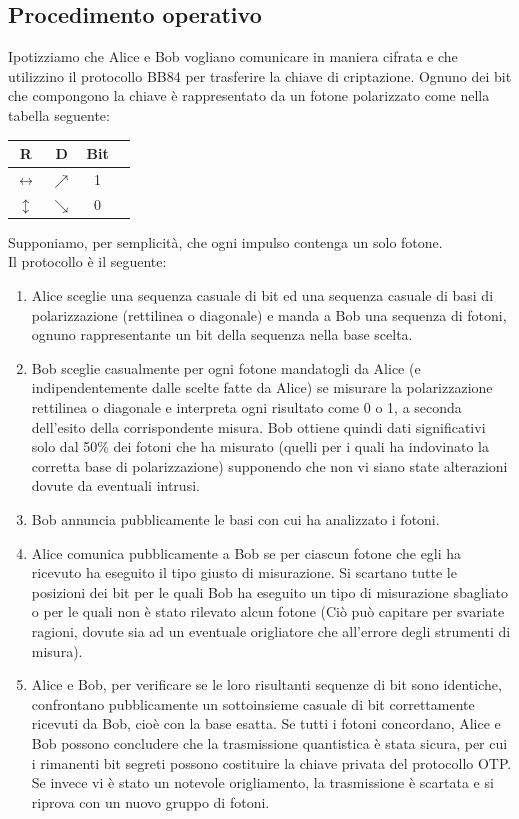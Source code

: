 \documentclass[italian,A4,12pt]{article}
\begin{document}
    \subsection{Procedimento operativo}
    Ipotizziamo che Alice e Bob vogliano comunicare in maniera cifrata e che utilizzino il protocollo BB84 per trasferire la chiave di criptazione. Ognuno dei bit che compongono la chiave è rappresentato da un fotone polarizzato come nella tabella seguente:
    \begin{center}
    \begin{tabular}{ |c|c|c|c| }
    \hline
    R & D & Bit \\
    \hline
    $\leftrightarrow$ & $\nearrow$ & 1 \\
    $\updownarrow$ & $\searrow$ & 0 \\
    \hline
    \end{tabular}
    \end{center}
    Supponiamo, per semplicità, che ogni impulso contenga un solo fotone.\\
    Il protocollo è il seguente:
    \begin{enumerate}
      \item Alice sceglie una sequenza casuale di bit ed una sequenza casuale di basi di polarizzazione (rettilinea o diagonale) e manda a Bob una sequenza di fotoni, ognuno rappresentante un bit della sequenza nella base scelta.
      \item Bob sceglie casualmente per ogni fotone mandatogli da Alice (e indipendentemente dalle scelte fatte da Alice) se misurare la polarizzazione rettilinea o diagonale e interpreta ogni risultato come 0 o 1, a seconda dell'esito della corrispondente misura. Bob ottiene quindi dati significativi solo dal 50\% dei fotoni che ha misurato (quelli per i quali ha indovinato la  corretta base di polarizzazione) supponendo che non vi siano state alterazioni dovute da eventuali intrusi.
      \item Bob annuncia pubblicamente le basi con cui ha analizzato i fotoni.
      \item Alice comunica pubblicamente a Bob se per ciascun fotone che egli ha ricevuto ha eseguito il tipo giusto di misurazione. Si scartano tutte le posizioni dei bit per le quali Bob ha eseguito un tipo di misurazione sbagliato o per le quali non è stato rilevato alcun fotone (Ciò può capitare per svariate ragioni, dovute sia ad un eventuale origliatore che all'errore degli strumenti di misura).
      \item Alice e Bob, per verificare se le loro risultanti sequenze di bit sono identiche, confrontano pubblicamente un sottoinsieme casuale di bit correttamente ricevuti da Bob, cioè con la base esatta. Se tutti i fotoni concordano, Alice e Bob possono concludere che la trasmissione quantistica è stata sicura, per cui i rimanenti bit segreti possono costituire la chiave privata del protocollo OTP. Se invece vi è stato un notevole origliamento, la trasmissione è scartata e si riprova con un nuovo gruppo di fotoni.
    \end{enumerate}
\end{document}
